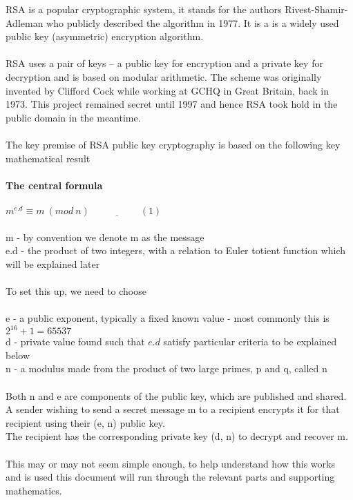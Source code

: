 \documentclass[11pt]{article}   	%
\begin{document}
RSA is a popular cryptographic system, it stands for the authors Rivest-Shamir-Adleman who publicly described the algorithm in 1977.
It is a is a widely used public key (asymmetric) encryption algorithm. \\
\\
RSA uses a pair of keys – a public key for encryption and a private key for decryption and is based on modular arithmetic.
The scheme was originally invented by Clifford Cock while working at GCHQ in Great Britain, back in 1973. This project remained secret until 1997 and hence RSA took hold in the public domain in the meantime. \\
\\
The key premise of RSA public key cryptography is based on the following key mathematical result \\
\\
\textbf{The central formula} \\
\\
$ m^{e.d} \equiv m \ (mod \ n)  \ \ \underline{\hspace{2cm}}(1) $\\
\\
m - by convention we denote m as the message \\
e.d - the product of two integers, with a relation to Euler totient function which will be explained later \\
\\
To set this up, we need to choose \\
\\
e - a public exponent, typically a fixed known value - most commonly this is $ 2^{16} + 1 = 65537 $ \\
d - private value found such that $ e.d $ satisfy particular criteria to be explained below \\
n - a modulus made from the product of two large primes, p and q, called n \\
\\
Both n and e are components of the public key, which are published and shared. \\
A sender wishing to send a secret message m to a recipient encrypts it for that recipient using their (e, n) public key. \\
The recipient has the corresponding private key (d, n) to decrypt and recover m. \\
\\
This may or may not seem simple enough, to help understand how this works and is used this document will run through the relevant parts and supporting mathematics. \\
\end{document}
